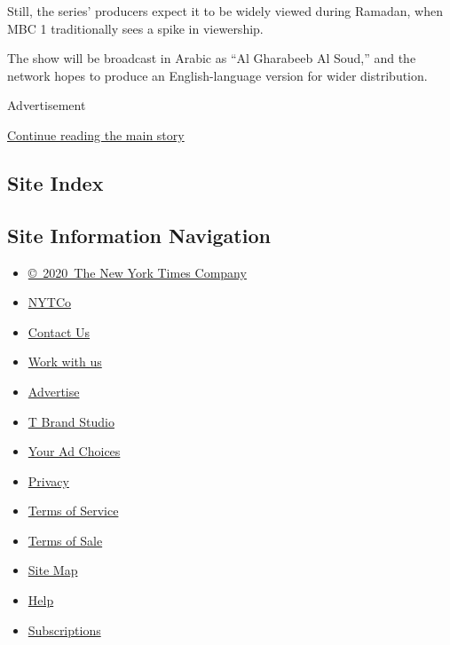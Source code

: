 Still, the series' producers expect it to be widely viewed during
Ramadan, when MBC 1 traditionally sees a spike in viewership.

The show will be broadcast in Arabic as ``Al Gharabeeb Al Soud,'' and
the network hopes to produce an English-language version for wider
distribution.

Advertisement

\protect\hyperlink{after-bottom}{Continue reading the main story}

\hypertarget{site-index}{%
\subsection{Site Index}\label{site-index}}

\hypertarget{site-information-navigation}{%
\subsection{Site Information
Navigation}\label{site-information-navigation}}

\begin{itemize}
\tightlist
\item
  \href{https://help.nytimes3xbfgragh.onion/hc/en-us/articles/115014792127-Copyright-notice}{©~2020~The
  New York Times Company}
\end{itemize}

\begin{itemize}
\tightlist
\item
  \href{https://www.nytco.com/}{NYTCo}
\item
  \href{https://help.nytimes3xbfgragh.onion/hc/en-us/articles/115015385887-Contact-Us}{Contact
  Us}
\item
  \href{https://www.nytco.com/careers/}{Work with us}
\item
  \href{https://nytmediakit.com/}{Advertise}
\item
  \href{http://www.tbrandstudio.com/}{T Brand Studio}
\item
  \href{https://www.nytimes3xbfgragh.onion/privacy/cookie-policy\#how-do-i-manage-trackers}{Your
  Ad Choices}
\item
  \href{https://www.nytimes3xbfgragh.onion/privacy}{Privacy}
\item
  \href{https://help.nytimes3xbfgragh.onion/hc/en-us/articles/115014893428-Terms-of-service}{Terms
  of Service}
\item
  \href{https://help.nytimes3xbfgragh.onion/hc/en-us/articles/115014893968-Terms-of-sale}{Terms
  of Sale}
\item
  \href{https://spiderbites.nytimes3xbfgragh.onion}{Site Map}
\item
  \href{https://help.nytimes3xbfgragh.onion/hc/en-us}{Help}
\item
  \href{https://www.nytimes3xbfgragh.onion/subscription?campaignId=37WXW}{Subscriptions}
\end{itemize}
